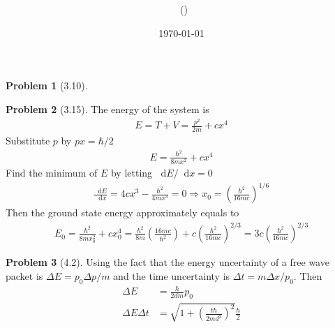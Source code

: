 \documentclass[twoside,11pt]{article}
\title{{\lms \Code \ \Ass}}
\author{\lms \name \ (\href{mailto:\mail}{\mail})}
\date{\sffamily \today}
\makeatletter
\renewcommand*\d{\mathop{}\!\mathrm{d}}
\theoremstyle{definition}
\newtheorem{problem}{Problem}
\theoremstyle{remark}
\newtheorem*{remark}{Remark}
\renewcommand{\maketitle}{\bgroup\setlength{\parindent}{0pt}
\begin{flushleft}
  \textbf{\Large\@title}

  \@author
\end{flushleft}\egroup
}
\makeatother
\begin{document}
\maketitle
\thispagestyle{title}


\begin{problem}[3.10]
\end{problem}


\begin{problem}[3.15]
The energy of the system is
\begin{align*}
    E = T + V = \frac{p^2}{2m} + cx^4
\end{align*}
Substitute $p$ by $px = \hbar/2$
\begin{align*}
    E = \frac{\hbar^2}{8mx^2} + cx^4
\end{align*}
Find the minimum of $E$ by letting $\d E/\d x=0$
\begin{align*}
    \frac{\d E}{\d x} = 4cx^3 - \frac{\hbar^2}{4mx^3} = 0\Rightarrow
    x_0=\left(\frac{\hbar^2}{16mc}\right)^{1/6}
\end{align*}
Then the ground state energy approximately equals to 
\begin{align*}
    E_0 = \frac{\hbar^2}{8mx_0^2} + cx_0^4 = \frac{\hbar^2}{8m}\left(
        \frac{16mc}{\hbar^2}
    \right) 
    + c\left(\frac{\hbar^2}{16mc}\right)^{2/3} 
    = 3c\left(\frac{\hbar^2}{16mc}\right)^{2/3}
\end{align*}
\end{problem}


\begin{problem}[4.2]
    Using the fact that the energy uncertainty of a free wave packet is
    $\Delta E = p_0\Delta p/m$ and the time uncertainty is
    $\Delta t = m\Delta x/p_0$.
    Then 
    \begin{align*}
        \Delta E &= \frac{\hbar}{2dm}p_0\\
        \Delta E\Delta t &= \sqrt{1+\left(\frac{t\hbar}{2md^2}\right)^2}\frac{\hbar}{2}
    \end{align*}
\end{problem}
\end{document}
